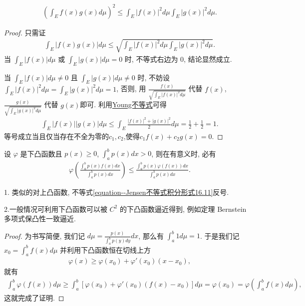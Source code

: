 \documentclass[../../main.tex]{subfiles}
\begin{document}
\begin{theorem}[Cauchy不等式]\label{theorem:Cauchy不等式(一般版本)}
\begin{align*}
\left(\int_E f(x)g(x) d\mu\right)^2 \leqslant \int_E |f(x)|^2 d\mu \int_E |g(x)|^2 d\mu.
\end{align*} 
\end{theorem}
\begin{proof}
只需证
\begin{align*}
\int_E |f(x)g(x)| d\mu \leqslant \sqrt{\int_E |f(x)|^2 d\mu \int_E |g(x)|^2 d\mu}.
\end{align*}
当 $\int_E |f(x)| d\mu$ 或 $\int_E |g(x)| d\mu = 0$ 时, 不等式右边为 $0$, 结论显然成立.

当 $\int_E |f(x)| d\mu \ne 0$ 且 $\int_E |g(x)| d\mu \ne 0$ 时, 不妨设 $\int_E |f(x)|^2 d\mu = \int_E |g(x)|^2 d\mu = 1$, 否则, 用 $\frac{f(x)}{\sqrt{\int_E |f(x)|^2 d\mu}}$ 代替 $f(x)$, $\frac{g(x)}{\sqrt{\int_E |g(x)|^2 d\mu}}$ 代替 $g(x)$即可.
利用\hyperref[theorem:Young不等式初等形式]{Young不等式}可得
\begin{align*}
\int_E |f(x)||g(x)| d\mu \leqslant \int_E \frac{|f(x)|^2 + |g(x)|^2}{2} d\mu = \frac{1}{2} + \frac{1}{2} = 1.
\end{align*}
等号成立当且仅当存在不全为零的$c_1,c_2$,使得$c_1f(x)+c_2g(x)=0.$
\end{proof}

\begin{theorem}[Jensen不等式积分形式]\label{theorem:Jensen不等式积分形式}
设 $\varphi$ 是下凸函数且 $p(x) \geqslant 0$, $\int_a^b p(x) dx > 0$, 则在有意义时, 必有
\begin{align}\label{equation--Jensen不等式积分形式16.11}
\varphi\left(\frac{\int_a^b p(x)f(x)dx}{\int_a^b p(x)dx}\right) \leqslant \frac{\int_a^b p(x)\varphi(f(x))dx}{\int_a^b p(x)dx}.
\end{align}
\end{theorem}
\begin{note}
1. 类似的对上凸函数, 不等式\eqref{equation--Jensen不等式积分形式16.11}反号.

2.一般情况可利用下凸函数可以被 $C^2$ 的下凸函数逼近得到, 例如定理 Bernstein 多项式保凸性一致逼近. 
\end{note}
\begin{proof}
为书写简便, 我们记 $d\mu = \frac{p(x)}{\int_a^b p(y)dy}dx$, 那么有 $\int_a^b 1d\mu = 1$. 于是我们记 $x_0 = \int_a^b f(x)d\mu$ 并利用下凸函数恒在切线上方
\begin{align*}
\varphi(x) \geqslant \varphi(x_0) + \varphi'(x_0)(x - x_0),
\end{align*}
就有
\begin{align*}
\int_a^b \varphi(f(x))d\mu \geqslant \int_a^b [\varphi(x_0) + \varphi'(x_0)(f(x) - x_0)]d\mu = \varphi(x_0) = \varphi\left(\int_a^b f(x)d\mu\right),
\end{align*}
这就完成了证明. 
\end{proof}
\end{document}
